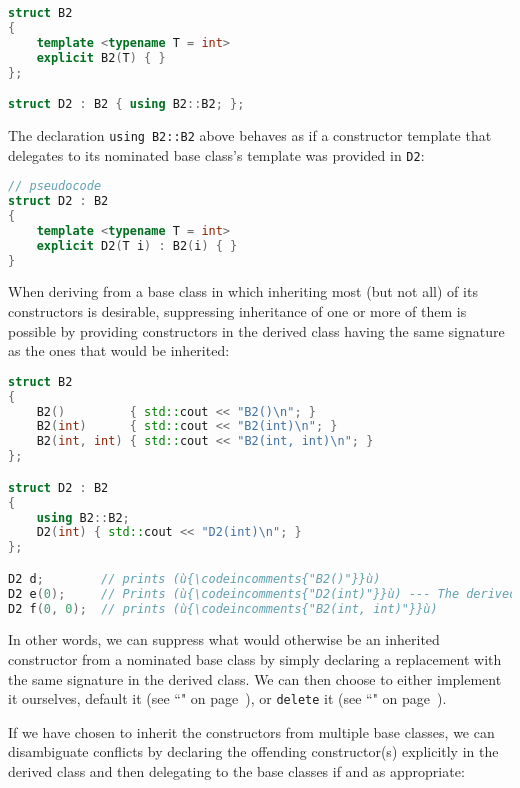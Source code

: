 \begin{lstlisting}[language=C++]
struct B2
{
    template <typename T = int>
    explicit B2(T) { }
};

struct D2 : B2 { using B2::B2; };
\end{lstlisting}

\noindent The declaration \texttt{using}~\texttt{B2::B2} above behaves as if a
constructor template that delegates to its nominated base class's
template was provided in \texttt{D2}:

\begin{lstlisting}[language=C++]
// pseudocode
struct D2 : B2
{
    template <typename T = int>
    explicit D2(T i) : B2(i) { }
}
\end{lstlisting}

\noindent When deriving from a base class in which inheriting most
(but not all) of its constructors is desirable, suppressing
inheritance of one or more of them is possible by providing constructors in the
derived class having the same signature as the ones that would be
inherited:

\begin{lstlisting}[language=C++]
struct B2
{
    B2()         { std::cout << "B2()\n"; }
    B2(int)      { std::cout << "B2(int)\n"; }
    B2(int, int) { std::cout << "B2(int, int)\n"; }
};

struct D2 : B2
{
    using B2::B2;
    D2(int) { std::cout << "D2(int)\n"; }
};

D2 d;        // prints (ù{\codeincomments{"B2()"}}ù)
D2 e(0);     // Prints (ù{\codeincomments{"D2(int)"}}ù) --- The derived constructor is invoked.
D2 f(0, 0);  // prints (ù{\codeincomments{"B2(int, int)"}}ù)
\end{lstlisting}

\noindent In other words, we can suppress what would otherwise be an inherited
constructor from a nominated base class by simply declaring a
replacement with the same signature in the derived class. We can then
choose to either implement it ourselves, default it (see ``" on page~\pageref{defaulted-special-member-functions}), or \texttt{delete} it (see ``" on page~\pageref{deleted-functions}).

If we have chosen to inherit the constructors from multiple
base classes, we can disambiguate conflicts by declaring the offending
constructor(s) explicitly in the derived class and then delegating to
the base classes if and as appropriate:


